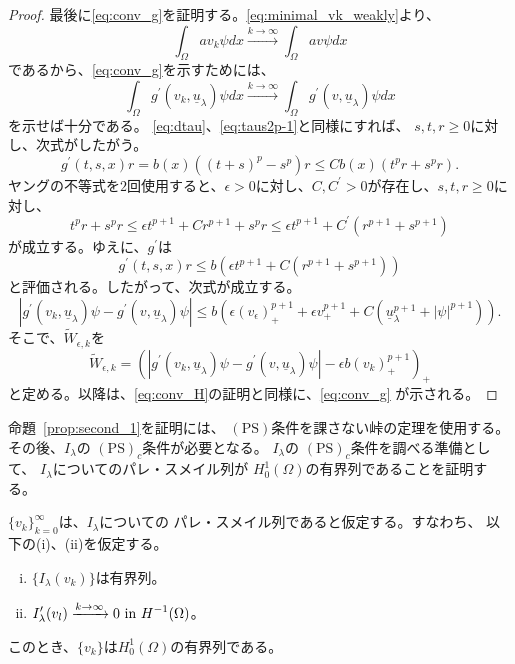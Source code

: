 \begin{proof}
 最後に\eqref{eq:conv_g}を証明する。\eqref{eq:minimal_vk_weakly}より、
 \[
  \int_\Omega a v_k \psi dx \xrightarrow{k \to \infty} \int_\Omega
 av\psi dx
 \]
 であるから、\eqref{eq:conv_g}を示すためには、
 \[
  \int_\Omega g^\prime(v_k, \underline{u}_\lambda)\psi dx \xrightarrow{
  k \to \infty } 
  \int_\Omega g^\prime(v, \underline{u}_\lambda)\psi dx
 \]
 を示せば十分である。
 \eqref{eq:dtau}、\eqref{eq:taus2p-1}と同様にすれば、
 $s, t, r \geq 0$に対し、次式がしたがう。
 \[
  g^\prime(t, s, x)r = b(x) \left( (t+s)^p - s^p \right) r \leq C b(x)
 \left( t^pr + s^p r \right).
 \]
 ヤングの不等式を$2$回使用すると、$\epsilon > 0$に対し、$C, C^\prime >
 0$が存在し、$s, t, r \geq 0$に対し、
 \[
  t^p r + s^p r \leq \epsilon t^{p+1} + C r^{p+1} + s^p r \leq
 \epsilon t^{p+1} + C^\prime (r^{p+1} + s^{p+1})
 \]
 が成立する。ゆえに、$g^\prime$は
 \[
  g^\prime(t, s, x)r \leq b \left( \epsilon t^{p+1} + C ( r^{p+1} +
 s^{p+1}) \right)
 \]
 と評価される。したがって、次式が成立する。
 \[  
  \left\lvert g^\prime(v_k, \underline{u}_\lambda)\psi - g^\prime(v,
   \underline{u}_\lambda)\psi \right\rvert \leq b \left( \epsilon
   (v_\epsilon)_+^{p+1}  + \epsilon v_+^{p+1} + C
   (\underline{u}_\lambda^{p+1} + \lvert \psi \rvert^{p+1})
                                 \right).
 \]
 そこで、$\tilde{W}_{\epsilon, k}$を
\[  \tilde{W}_{\epsilon, k} = 
   \left( \left\lvert g^\prime(v_k, \underline{u}_\lambda)\psi - g^\prime(v,
    \underline{u}_\lambda)\psi \right\rvert
  -\epsilon b (v_k)_+^{p+1}
          \right)_+ \]
 と定める。以降は、\eqref{eq:conv_H}の証明と同様に、\eqref{eq:conv_g}
 が示される。\qedhere
\end{proof}

命題~\ref{prop:second_1}を証明には、
$(\mathrm{PS})$条件を課さない峠の定理を使用する。
その後、$I_\lambda$の
$(\mathrm{PS})_c$条件が必要となる。
$I_\lambda$の
$(\mathrm{PS})_c$条件を調べる準備として、
$I_\lambda$についてのパレ・スメイル列が
$H_0^1(\Omega)$の有界列であることを証明する。

\begin{lem} \label{lem:PS_seq}
 $\{ v_k \}_{k=0}^\infty$は、$I_\lambda$についての
 パレ・スメイル列であると仮定する。すなわち、
 以下の(i)、(ii)を仮定する。
 \begin{enumerate}[(i)]
  \item $\{ I_\lambda(v_k) \}$は有界列。
  \item $\displaystyle I^\prime_{\lambda} (v_l) \xrightarrow{k \to
        \infty} 0 ~\text{in}~ H^{-1}(\Omega)$。
 \end{enumerate}
 このとき、$\{ v_k \}$は$H_0^1(\Omega)$の有界列である。
\end{lem}

